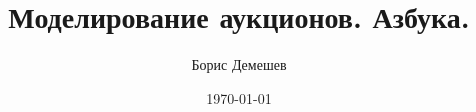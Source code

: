 \documentclass[pdftex,12pt,a4paper]{article}
\title{Моделирование аукционов. Азбука. }
\author{Борис Демешев}
\date{\today}
\numberwithin{equation}{page} %
\theoremstyle{definition} %
\theoremstyle{definition}
\theoremstyle{definition}
\begin{document}
\maketitle
\tableofcontents{}







\printindex %



%
\end{document}
